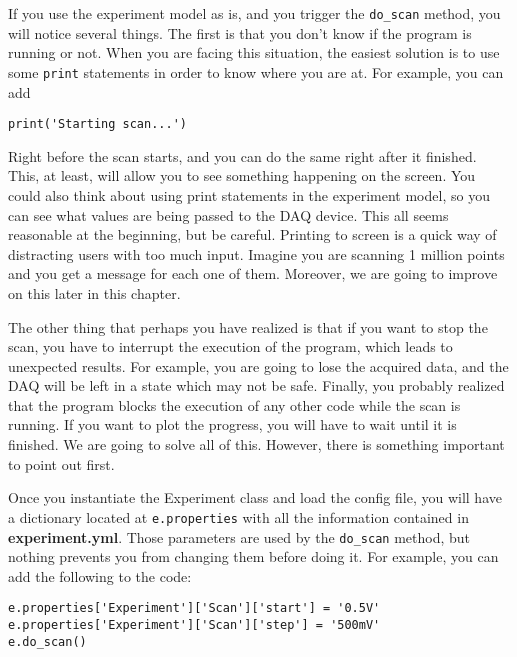 
If you use the experiment model as is, and you trigger the \texttt{do_scan} method, you will notice several things. The first is that you don't know if the program is running or not. When you are facing this situation, the easiest solution is to use some \texttt{print} statements in order to know where you are at. For example, you can add 
\begin{verbatim}
print('Starting scan...')
\end{verbatim} 
Right before the scan starts, and you can do the same right after it finished. This, at least, will allow you to see something happening on the screen. You could also think about using print statements in the experiment model, so you can see what values are being passed to the DAQ device. This all seems reasonable at the beginning, but be careful. Printing to screen is a quick way of distracting users with too much input. Imagine you are scanning 1 million points and you get a message for each one of them. Moreover, we are going to improve on this later in this chapter. 

The other thing that perhaps you have realized is that if you want to stop the scan, you have to interrupt the execution of the program, which leads to unexpected results. For example, you are going to lose the acquired data, and the DAQ will be left in a state which may not be safe. Finally, you probably realized that the program blocks the execution of any other code while the scan is running. If you want to plot the progress, you will have to wait until it is finished. We are going to solve all of this. However, there is something important to point out first.

Once you instantiate the Experiment class and load the config file, you will have a dictionary located at \texttt{e.properties} with all the information contained in \textbf{experiment.yml}. Those parameters are used by the \texttt{do_scan} method, but nothing prevents you from changing them before doing it. For example, you can add the following to the code:

\begin{verbatim}
e.properties['Experiment']['Scan']['start'] = '0.5V'
e.properties['Experiment']['Scan']['step'] = '500mV'
e.do_scan()
\end{verbatim}

